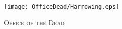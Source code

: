 \fancyhead[RE,LO]{}
\fancyhead[RO,LE]{}
\fancyhead[C]{}
\thispagestyle{empty}
{}

\begin{figure}[H]
    \centering
    \texttt{[image: OfficeDead/Harrowing.eps]}
    \caption{\textsc{\Huge{Office of the Dead}}}
\end{figure}